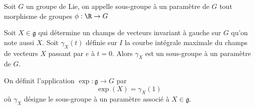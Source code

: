 \begin{defi}
Soit $G$ un groupe de Lie, on appelle sous-groupe à un paramètre de $G$ tout morphisme de groupes $\phi : \R \to G$
\end{defi}

\begin{pro}
Soit $X \in \mathfrak{g}$ qui détermine un champs de vecteurs invariant à gauche sur $G$ qu'on note aussi $X$. Soit $\gamma_X(t)$ définie sur $I$ la courbe intégrale maximale du champs de vecteurs $X$ passant par $e$ à $t=0$. Alors $\gamma_X$ est un sous-groupe à un paramètre de $G$.
\end{pro}

\begin{defi}[Exponentielle]
On définit l'application $\exp : \mathfrak{g} \to G$ par 
$$\exp(X) = \gamma_X(1)$$
où $\gamma_X$ désigne le sous-groupe à un paramètre associé à $X\in \mathfrak{g}$.
\end{defi}
